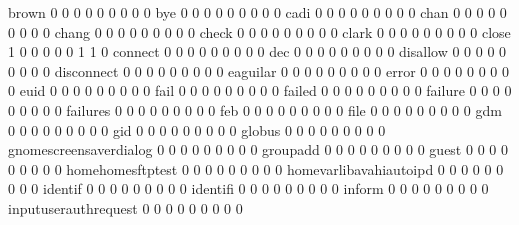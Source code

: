 \documentclass[compress,8pt]{beamer}
\begin{document}
\begin{frame}
\begin{Schunk}
  brown                                      0   0   0   0   0   0   0   0   0
  bye                                        0   0   0   0   0   0   0   0   0
  cadi                                       0   0   0   0   0   0   0   0   0
  chan                                       0   0   0   0   0   0   0   0   0
  chang                                      0   0   0   0   0   0   0   0   0
  check                                      0   0   0   0   0   0   0   0   0
  clark                                      0   0   0   0   0   0   0   0   0
  close                                      1   0   0   0   0   0   1   1   0
  connect                                    0   0   0   0   0   0   0   0   0
  dec                                        0   0   0   0   0   0   0   0   0
  disallow                                   0   0   0   0   0   0   0   0   0
  disconnect                                 0   0   0   0   0   0   0   0   0
  eaguilar                                   0   0   0   0   0   0   0   0   0
  error                                      0   0   0   0   0   0   0   0   0
  euid                                       0   0   0   0   0   0   0   0   0
  fail                                       0   0   0   0   0   0   0   0   0
  failed                                     0   0   0   0   0   0   0   0   0
  failure                                    0   0   0   0   0   0   0   0   0
  failures                                   0   0   0   0   0   0   0   0   0
  feb                                        0   0   0   0   0   0   0   0   0
  file                                       0   0   0   0   0   0   0   0   0
  gdm                                        0   0   0   0   0   0   0   0   0
  gid                                        0   0   0   0   0   0   0   0   0
  globus                                     0   0   0   0   0   0   0   0   0
  gnomescreensaverdialog                     0   0   0   0   0   0   0   0   0
  groupadd                                   0   0   0   0   0   0   0   0   0
  guest                                      0   0   0   0   0   0   0   0   0
  homehomesftptest                           0   0   0   0   0   0   0   0   0
  homevarlibavahiautoipd                     0   0   0   0   0   0   0   0   0
  identif                                    0   0   0   0   0   0   0   0   0
  identifi                                   0   0   0   0   0   0   0   0   0
  inform                                     0   0   0   0   0   0   0   0   0
  inputuserauthrequest                       0   0   0   0   0   0   0   0   0

\end{Schunk}
\end{frame}
\end{document}
